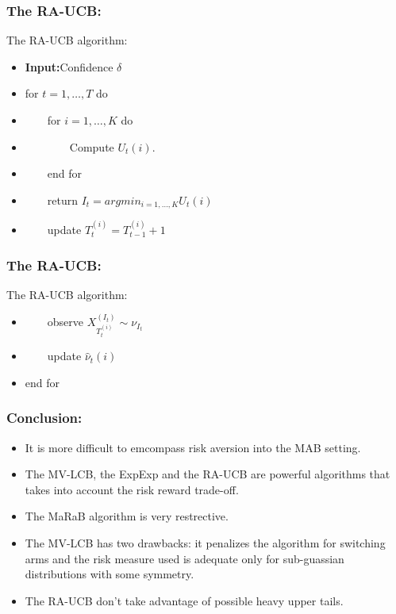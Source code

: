 \documentclass[english]{beamer}
\begin{document}
\begin{frame}
\frametitle{The RA-UCB:}
\begin{block}{The RA-UCB algorithm:}
\begin{itemize}
\item[1. \ ] \textbf{Input:}Confidence $\delta$
\item[2. \ ] for $t=1,\dots,T$ do
\item[3. \ ] \ \ \ \ for $i=1,\dots,K$ do 
\item[4. \ ] \ \ \ \ \ \ \ \ Compute $U_t(i)$.
\item[5. \ ] \ \ \ \ end for
\item[6. \ ] \ \ \ \ return $I_t=arg min_{i=1,\dots,K}U_t(i)$
\item[7. \ ] \ \ \ \ update $T^{(i)}_{t}=T^{(i)}_{t-1}+1$
\end{itemize}
\end{block}
\end{frame}

\begin{frame}
\frametitle{The RA-UCB:}
\begin{block}{The RA-UCB algorithm:}
\begin{itemize}

\item[8. \ ] \ \ \ \ observe $X^{(I_t)}_{T^{(i)}_{t}} \sim \nu_{I_t}$
\item[9. \ ] \ \ \ \ update $\hat{\nu}_t(i)$
\item[10. \ ] end for
\end{itemize}

\end{block}
\end{frame}

\begin{frame}
\frametitle{Conclusion:}
\begin{itemize}
\item It is more difficult to emcompass risk aversion into the MAB setting.
\item The MV-LCB, the ExpExp and the RA-UCB are powerful algorithms that takes into account the risk reward trade-off.
\item The MaRaB algorithm is very restrective.
\item The MV-LCB has two drawbacks: it penalizes the algorithm for switching arms and the risk measure used is adequate only for sub-guassian distributions with some symmetry.
\item The RA-UCB don't take advantage of possible heavy upper tails.
\end{itemize}
\end{frame}
\end{document}
